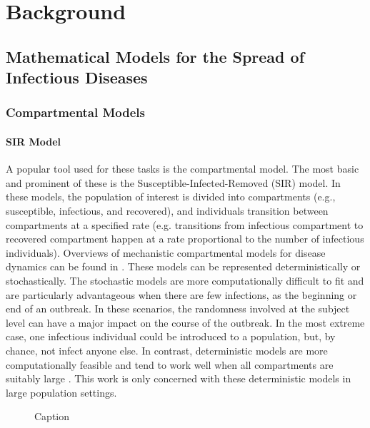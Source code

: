 \chapter{Background}
\label{ch:background}

\section{Mathematical Models for the Spread of Infectious Diseases}
\label{sec:math_models}
\subsection{Compartmental Models}

\subsubsection{SIR Model}


A popular tool used for these tasks is the compartmental model.
The most basic and prominent of these is the Susceptible-Infected-Removed (SIR) model.
In these models, the population of interest is divided into compartments (e.g., susceptible, infectious, and recovered), and individuals transition between compartments at a specified rate (e.g. transitions from infectious compartment to recovered compartment happen at a rate proportional to the number of infectious individuals).
Overviews of mechanistic compartmental models for disease dynamics can be found in \citep{anderson1992infectious, Brauer2008, keeling2011modeling, 10.1093/aje/kww021}.
These models can be represented deterministically or stochastically.
The stochastic models are more computationally difficult to fit and are particularly advantageous when there are few infections, as the beginning or end of an outbreak.
In these scenarios, the randomness involved at the subject level can have a major impact on the course of the outbreak.
In the most extreme case, one infectious individual could be introduced to a population, but, by chance, not infect anyone else.
In contrast, deterministic models are more computationally feasible and tend to work well when all compartments are suitably large \citep{doi:10.1098/rspb.2015.0347}.
This work is only concerned with these deterministic models in large population settings.

\begin{figure}
    \centering
    \caption{Caption}
    \label{fig:ch_2:SIR_diagram}
\end{figure}


